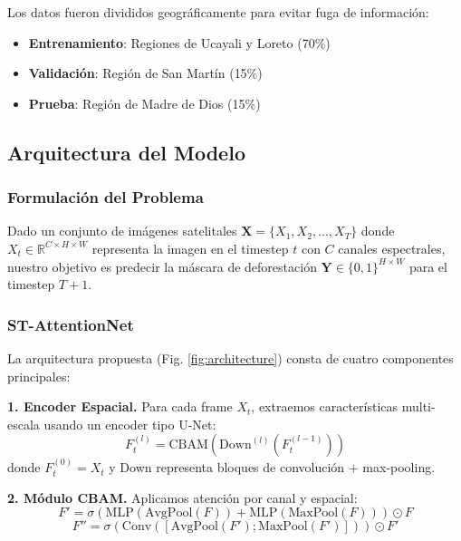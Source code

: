 \documentclass[conference]{IEEEtran}
\begin{document}
Los datos fueron divididos geográficamente para evitar fuga de información:
\begin{itemize}
    \item \textbf{Entrenamiento}: Regiones de Ucayali y Loreto (70\%)
    \item \textbf{Validación}: Región de San Martín (15\%)
    \item \textbf{Prueba}: Región de Madre de Dios (15\%)
\end{itemize}

\subsection{Arquitectura del Modelo}

\subsubsection{Formulación del Problema}

Dado un conjunto de imágenes satelitales $\mathbf{X} = \{X_1, X_2, ..., X_T\}$ donde $X_t \in \mathbb{R}^{C \times H \times W}$ representa la imagen en el timestep $t$ con $C$ canales espectrales, nuestro objetivo es predecir la máscara de deforestación $\mathbf{Y} \in \{0, 1\}^{H \times W}$ para el timestep $T+1$.

\subsubsection{ST-AttentionNet}

La arquitectura propuesta (Fig. \ref{fig:architecture}) consta de cuatro componentes principales:

\textbf{1. Encoder Espacial.} Para cada frame $X_t$, extraemos características multi-escala usando un encoder tipo U-Net:
\begin{equation}
    F_t^{(l)} = \text{CBAM}(\text{Down}^{(l)}(F_t^{(l-1)}))
\end{equation}
donde $F_t^{(0)} = X_t$ y Down representa bloques de convolución + max-pooling.

\textbf{2. Módulo CBAM.} Aplicamos atención por canal y espacial:
\begin{equation}
    F' = \sigma(\text{MLP}(\text{AvgPool}(F)) + \text{MLP}(\text{MaxPool}(F))) \odot F
\end{equation}
\begin{equation}
    F'' = \sigma(\text{Conv}([\text{AvgPool}(F'); \text{MaxPool}(F')])) \odot F'
\end{equation}
\end{document}
